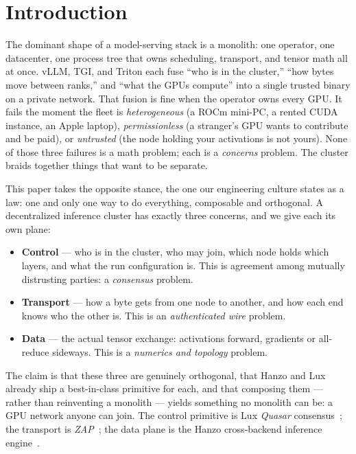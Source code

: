 \documentclass[11pt]{article}
\begin{document}
\section{Introduction}
\label{sec:intro}

The dominant shape of a model-serving stack is a monolith: one operator, one datacenter, one
process tree that owns scheduling, transport, and tensor math all at once. vLLM, TGI, and
Triton each fuse ``who is in the cluster,'' ``how bytes move between ranks,'' and ``what the
GPUs compute'' into a single trusted binary on a private network. That fusion is fine when the
operator owns every GPU. It fails the moment the fleet is \emph{heterogeneous} (a ROCm mini-PC,
a rented CUDA instance, an Apple laptop), \emph{permissionless} (a stranger's GPU wants to
contribute and be paid), or \emph{untrusted} (the node holding your activations is not yours).
None of those three failures is a math problem; each is a \emph{concerns} problem. The cluster
braids together things that want to be separate.

This paper takes the opposite stance, the one our engineering culture states as a law: one and
only one way to do everything, composable and orthogonal. A decentralized inference cluster has
exactly three concerns, and we give each its own plane:
\begin{itemize}[leftmargin=1.4em,itemsep=2pt]
\item \textbf{Control} --- who is in the cluster, who may join, which node holds which layers,
and what the run configuration is. This is agreement among mutually distrusting parties: a
\emph{consensus} problem.
\item \textbf{Transport} --- how a byte gets from one node to another, and how each end knows
who the other is. This is an \emph{authenticated wire} problem.
\item \textbf{Data} --- the actual tensor exchange: activations forward, gradients or
all-reduce sideways. This is a \emph{numerics and topology} problem.
\end{itemize}
The claim is that these three are genuinely orthogonal, that Hanzo and Lux already ship a
best-in-class primitive for each, and that composing them --- rather than reinventing a
monolith --- yields something no monolith can be: a GPU network anyone can join. The control
primitive is Lux \emph{Quasar} consensus~\cite{quasar,luxconsensus}; the transport is
\emph{ZAP}~\cite{zap,lp201}; the data plane is the Hanzo cross-backend inference
engine~\cite{infstack}.
\end{document}

